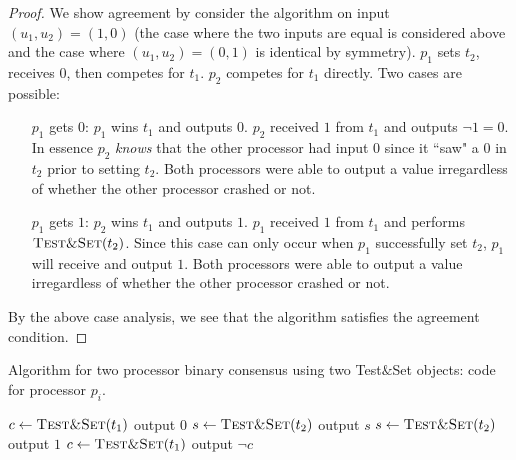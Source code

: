 \documentclass[11pt]{article}
\newcommand\testNsetF{\textsc{Test\&Set}}
\begin{document}
\begin{proof}
We show agreement by consider the algorithm on input $(u_1, u_2) = (1,0)$ (the case where the two inputs are equal is considered above and the case where $(u_1, u_2) = (0,1)$ is identical by symmetry). $p_1$ sets $t_2$, receives $0$, then competes for $t_1$. $p_2$ competes for $t_1$ directly. Two cases are possible:
\begin{enumerate}
\item[$p_1$ gets $0$:] $p_1$ wins $t_1$ and outputs $0$. $p_2$ received $1$ from $t_1$ and outputs $\lnot 1 = 0$. In essence $p_2$ \emph{knows} that the other processor had input $0$ since it ``saw" a $0$ in $t_2$ prior to setting $t_2$. Both processors were able to output a value irregardless of whether the other processor crashed or not. 
\item[$p_1$ gets $1$:] $p_2$ wins $t_1$ and outputs $1$. $p_1$ received $1$ from $t_1$ and performs $\testNsetF(t_2)$. Since this case can only occur when $p_1$ successfully set $t_2$, $p_1$ will receive and output $1$. Both processors were able to output a value irregardless of whether the other processor crashed or not.   
\end{enumerate} 
By the above case analysis, we see that the algorithm satisfies the agreement condition.
\end{proof}

\begin{algorithm}
	\caption{Algorithm for two processor binary consensus using two Test$\&$Set objects: code for processor $p_i$.}
    \label{pseudocode:BCTwoTestNSet}
    \begin{algorithmic}[1]
		\State $c \leftarrow \testNsetF(t_1)$
			\State output $0$
		\Else
			\State $s \leftarrow \testNsetF(t_2)$
			\State output $s$
		\EndIf  
    \Else
    	\State $s \leftarrow \testNsetF(t_2)$
			\State output $1$
		\EndIf
		\State $c \leftarrow \testNsetF(t_1)$
		\State output $\lnot c$
    \EndIf
    \end{algorithmic}
\end{algorithm}
\end{document}
